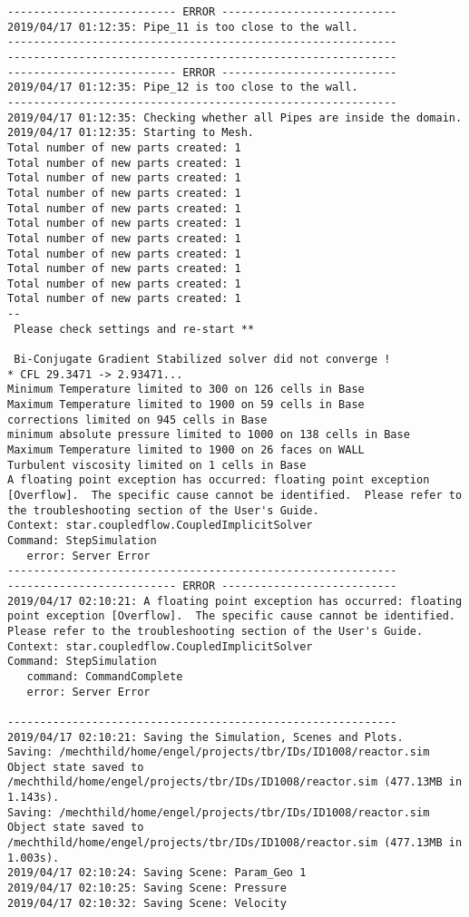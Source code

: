 \documentclass{article}
\begin{document}
{\begin{verbatim}
-------------------------- ERROR ---------------------------
2019/04/17 01:12:35: Pipe_11 is too close to the wall.
------------------------------------------------------------
------------------------------------------------------------
-------------------------- ERROR ---------------------------
2019/04/17 01:12:35: Pipe_12 is too close to the wall.
------------------------------------------------------------
2019/04/17 01:12:35: Checking whether all Pipes are inside the domain.
2019/04/17 01:12:35: Starting to Mesh.
Total number of new parts created: 1
Total number of new parts created: 1
Total number of new parts created: 1
Total number of new parts created: 1
Total number of new parts created: 1
Total number of new parts created: 1
Total number of new parts created: 1
Total number of new parts created: 1
Total number of new parts created: 1
Total number of new parts created: 1
Total number of new parts created: 1
--
 Please check settings and re-start ** 

 Bi-Conjugate Gradient Stabilized solver did not converge !
* CFL 29.3471 -> 2.93471...
Minimum Temperature limited to 300 on 126 cells in Base
Maximum Temperature limited to 1900 on 59 cells in Base
corrections limited on 945 cells in Base
minimum absolute pressure limited to 1000 on 138 cells in Base
Maximum Temperature limited to 1900 on 26 faces on WALL
Turbulent viscosity limited on 1 cells in Base
A floating point exception has occurred: floating point exception [Overflow].  The specific cause cannot be identified.  Please refer to the troubleshooting section of the User's Guide.
Context: star.coupledflow.CoupledImplicitSolver
Command: StepSimulation
   error: Server Error
------------------------------------------------------------
-------------------------- ERROR ---------------------------
2019/04/17 02:10:21: A floating point exception has occurred: floating point exception [Overflow].  The specific cause cannot be identified.  Please refer to the troubleshooting section of the User's Guide.
Context: star.coupledflow.CoupledImplicitSolver
Command: StepSimulation
   command: CommandComplete
   error: Server Error

------------------------------------------------------------
2019/04/17 02:10:21: Saving the Simulation, Scenes and Plots.
Saving: /mechthild/home/engel/projects/tbr/IDs/ID1008/reactor.sim
Object state saved to /mechthild/home/engel/projects/tbr/IDs/ID1008/reactor.sim (477.13MB in 1.143s).
Saving: /mechthild/home/engel/projects/tbr/IDs/ID1008/reactor.sim
Object state saved to /mechthild/home/engel/projects/tbr/IDs/ID1008/reactor.sim (477.13MB in 1.003s).
2019/04/17 02:10:24: Saving Scene: Param_Geo 1
2019/04/17 02:10:25: Saving Scene: Pressure
2019/04/17 02:10:32: Saving Scene: Velocity
\end{verbatim}
}
\clearpage
\end{document}
